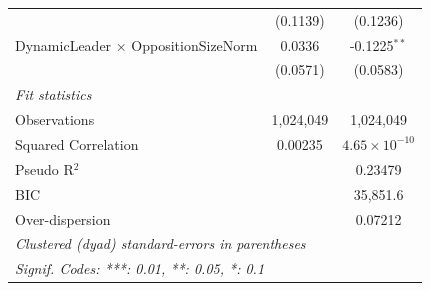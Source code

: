 \begin{tabular}{lcc}
                                              & (0.1139)             & (0.1236)\\   
   DynamicLeader $\times$ OppositionSizeNorm  & 0.0336               & -0.1225$^{**}$\\   
                                              & (0.0571)             & (0.0583)\\   
   \midrule
   \emph{Fit statistics}\\
   Observations                               & 1,024,049            & 1,024,049\\  
   Squared Correlation                        & 0.00235              & $4.65\times 10^{-10}$\\   
   Pseudo R$^2$                               &                      & 0.23479\\  
   BIC                                        &                      & 35,851.6\\  
   Over-dispersion                            &                      & 0.07212\\  
   \midrule \midrule
   \multicolumn{3}{l}{\emph{Clustered (dyad) standard-errors in parentheses}}\\
   \multicolumn{3}{l}{\emph{Signif. Codes: ***: 0.01, **: 0.05, *: 0.1}}\\
\end{tabular}
\par\endgroup


